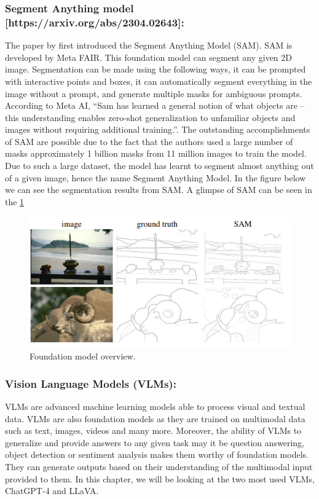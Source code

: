 \subsubsection{Segment Anything model [https://arxiv.org/abs/2304.02643]:}
The paper by \citet{kirillov2023segment} first introduced the Segment Anything Model (SAM). SAM is developed by Meta FAIR. 
This foundation model can segment any given 2D image. Segmentation can be made using the following ways, 
it can be prompted with interactive points and boxes, it can automatically segment everything in the image without a prompt, 
and generate multiple masks for ambiguous prompts. According to Meta AI, “Sam has learned a general notion of what objects are – this understanding enables zero-shot generalization to 
unfamiliar objects and images without requiring additional training.”. The outstanding accomplishments of SAM are possible due to the fact that
the authors used a large number of masks approximately 1 billion masks from 11 million images to train the model. Due to such a large dataset, 
the model has learnt to segment almost anything out of a given image, hence the name Segment Anything Model. In the figure below we can see the segmentation results from SAM.
A glimpse of SAM can be seen in the \cref{fig:sam}
\begin{figure}[ht!]
    \centering
    \includegraphics[width=\textwidth]{content/images/SAM.png}
    \caption{Foundation model overview. \cite{kirillov2023segment}}
    \label{fig:sam}
\end{figure}
\subsubsection{Vision Language Models (VLMs):}
VLMs are advanced machine learning models able to process visual and textual data. VLMs are also foundation models as they are trained on multimodal data such as text, images,
videos and many more. Moreover, the ability of VLMs to generalize and provide answers to any given task may it be question answering, object detection or sentiment analysis makes
them worthy of foundation models. They can generate outputs based on their understanding of the multimodal input provided to them. 
In this chapter, we will be looking at the two most used VLMs, ChatGPT-4 and LLaVA.


